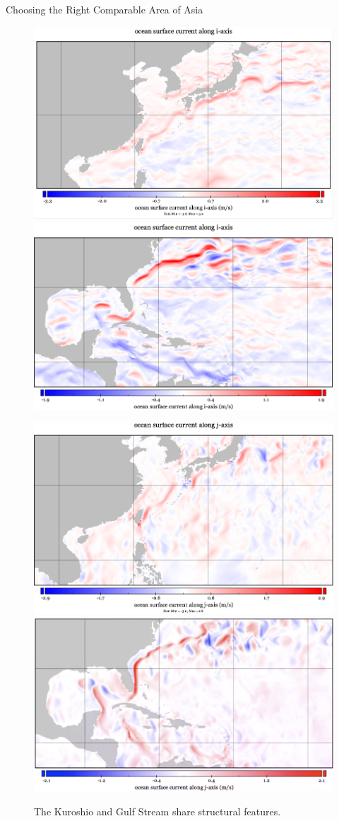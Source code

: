\begin{frame}{Choosing the Right Comparable Area of Asia}
\vspace{-30pt}
\hspace{-30pt}
 \begin{minipage}{1.15\textwidth}
\begin{figure}[htb!]
    \centering
   \hspace{-40pt} \includegraphics[width=0.42\linewidth]{images/example-images/c-uos.png}
        \includegraphics[width=0.42\linewidth]{images/example-images/uos.png}

   \hspace{-40pt} \includegraphics[width=0.42\linewidth]{images/example-images/c-vos.png}
        \includegraphics[width=0.42\linewidth]{images/example-images/vos.png}
    \vspace{-10pt}
    \caption{The Kuroshio and Gulf Stream share structural features.}
    \label{fig:A}
\end{figure}
\end{minipage}
\end{frame}


